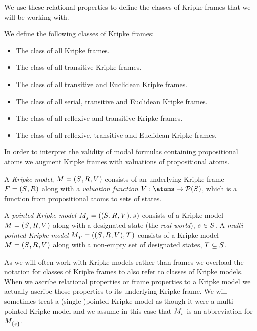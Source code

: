 We use these relational properties to define the classes of Kripke frames that we will be working with.

\begin{definition}
We define the following classes of Kripke frames:
\begin{itemize}
    \item The class \classK{} of all Kripke frames.
    \item The class \classKF{} of all transitive Kripke frames.
    \item The class \classKFF{} of all transitive and Euclidean Kripke frames.
    \item The class \classKD{} of all serial, transitive and Euclidean Kripke frames.
    \item The class \classSF{} of all reflexive and transitive Kripke frames.
    \item The class \classS{} of all reflexive, transitive and Euclidean Kripke frames.
\end{itemize}
\end{definition}

In order to interpret the validity of modal formulas containing propositional atoms we augment Kripke frames with valuations of propositional atoms.

\begin{definition}
A {\em Kripke model}, $\kModelAndTuple$ consists of an underlying Kripke frame $\kFrameAndTuple$ along with a {\em valuation function} $\kValuation : \atoms \to \powerset(\kStates)$, which is a function from propositional atoms to sets of states.

A {\em pointed Kripke model} $\kPModelAndTuple{\kStateS}$ consists of a Kripke model $\kModelAndTuple$ along with a designated state (the {\em real world}), $\kStateS \in \kStates$.
A {\em multi-pointed Kripke model} $\kPModelAndTuple{\kStatesT}$ consists of a Kripke model $\kModelAndTuple$ along with a non-empty set of designated states, $\kStatesT \subseteq \kStates$.
\end{definition}

As we will often work with Kripke models rather than frames we overload the notation for classes of Kripke frames to also refer to classes of Kripke models.
When we ascribe relational properties or frame properties to a Kripke model we actually ascribe those properties to its underlying Kripke frame.
We will sometimes treat a (single-)pointed Kripke model as though it were a multi-pointed Kripke model and we assume in this case that $\kPModel{\kStateS}$ is an abbreviation for $\kPModel{\{\kStateS\}}$.

